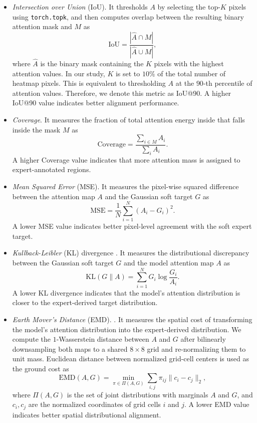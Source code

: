 \documentclass[lineno,pdflatex,sn-mathphys-num]{sn-jnl}%
\theoremstyle{thmstyleone}%
\theoremstyle{thmstyletwo}%
\theoremstyle{thmstylethree}%
\begin{document}
\begin{itemize}
\item \textit{Intersection over Union} (IoU). It thresholds $A$ by selecting the top-$K$ pixels using \texttt{torch.topk}, and then computes overlap between the resulting binary attention mask and $M$ as
\begin{equation}
\mathrm{IoU} = \frac{|\hat{A} \cap M|}{|\hat{A} \cup M|},
\end{equation}
where $\hat{A}$ is the binary mask containing the $K$ pixels with the highest attention values. In our study, $K$ is set to $10\%$ of the total number of heatmap pixels. This is equivalent to thresholding $A$ at the $90$-th percentile of attention values. Therefore, we denote this metric as IoU@90. A higher IoU@90 value indicates better alignment performance.

\item \textit{Coverage}. It measures the fraction of total attention energy inside that falls inside the mask $M$ as
\begin{equation}
\text{Coverage} = \frac{\sum_{i \in M} A_i}{\sum_i A_i}.
\end{equation}
A higher Coverage value indicates that more attention mass is assigned to expert-annotated regions.

\item \textit{Mean Squared Error} (MSE). It measures the pixel-wise squared difference between the attention map $A$ and the Gaussian soft target $G$ as
\begin{equation}
\mathrm{MSE} = \frac{1}{N}\sum_{i=1}^{N}\left(A_i - G_i\right)^{2}.
\end{equation}
A lower MSE value indicates better pixel-level agreement with the soft expert target.

\item \textit{Kullback-Leibler} (KL) divergence \cite{Kullback1951}. It measures the distributional discrepancy between the Gaussian soft target $G$ and the model attention map $A$ as
\begin{equation}
\mathrm{KL}(G \| A) = \sum_{i=1}^{N} G_i \log\frac{G_i}{A_i}.
\end{equation}
A lower KL divergence indicates that the model's attention distribution is closer to the expert-derived target distribution.

\item \textit{Earth Mover's Distance} (EMD). \cite{Rubner2000}. It measures the spatial cost of transforming the model's attention distribution into the expert-derived distribution. We compute the $1$-Wasserstein distance between $A$ and $G$ after bilinearly downsampling both maps to a shared $8 \times 8$ grid and re-normalizing them to unit mass. Euclidean distance between normalized grid-cell centers is used as the ground cost as
\begin{equation}
\mathrm{EMD}(A, G) = \min_{\pi \in \Pi(A, G)}\sum_{i,j} \pi_{ij} \|c_i - c_j\|_2,
\end{equation}
where $\Pi(A, G)$ is the set of joint distributions with marginals $A$ and $G$, and $c_i, c_j$ are the normalized coordinates of grid cells $i$ and $j$. A lower EMD value indicates better spatial distributional alignment.
\end{itemize}
\end{document}
